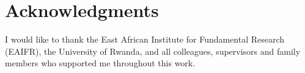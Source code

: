 \chapter*{Acknowledgments}

I would like to thank the East African Institute for Fundamental Research (EAIFR),
the University of Rwanda, and all colleagues, supervisors and family members
who supported me throughout this work.
